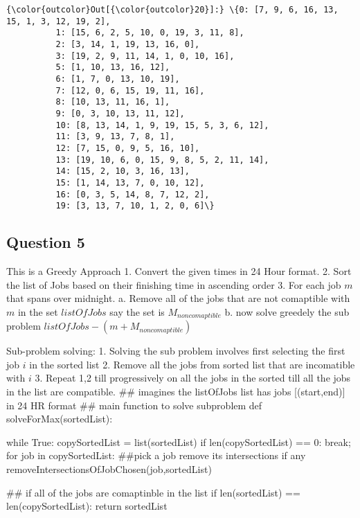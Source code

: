\documentclass[11pt]{article}
\begin{document}
\begin{Verbatim}[commandchars=\\\{\}]
{\color{outcolor}Out[{\color{outcolor}20}]:} \{0: [7, 9, 6, 16, 13, 15, 1, 3, 12, 19, 2],
          1: [15, 6, 2, 5, 10, 0, 19, 3, 11, 8],
          2: [3, 14, 1, 19, 13, 16, 0],
          3: [19, 2, 9, 11, 14, 1, 0, 10, 16],
          5: [1, 10, 13, 16, 12],
          6: [1, 7, 0, 13, 10, 19],
          7: [12, 0, 6, 15, 19, 11, 16],
          8: [10, 13, 11, 16, 1],
          9: [0, 3, 10, 13, 11, 12],
          10: [8, 13, 14, 1, 9, 19, 15, 5, 3, 6, 12],
          11: [3, 9, 13, 7, 8, 1],
          12: [7, 15, 0, 9, 5, 16, 10],
          13: [19, 10, 6, 0, 15, 9, 8, 5, 2, 11, 14],
          14: [15, 2, 10, 3, 16, 13],
          15: [1, 14, 13, 7, 0, 10, 12],
          16: [0, 3, 5, 14, 8, 7, 12, 2],
          19: [3, 13, 7, 10, 1, 2, 0, 6]\}
\end{Verbatim}
            
    \subsection{Question 5}\label{question-5}

    This is a Greedy Approach 1. Convert the given times in 24 Hour format.
2. Sort the list of Jobs based on their finishing time in ascending
order 3. For each job \(m\) that spans over midnight. a. Remove all of
the jobs that are not comaptible with \(m\) in the set \(listOfJobs\)
say the set is \(M_{noncomaptible}\) b. now solve greedely the sub
problem \(listOfJobs - (m + M_{noncomaptible})\)

Sub-problem solving: 1. Solving the sub problem involves first selecting
the first job \(i\) in the sorted list 2. Remove all the jobs from
sorted list that are incomatible with \(i\) 3. Repeat 1,2 till
progressively on all the jobs in the sorted till all the jobs in the
list are compatible.
## imagines the listOfJobs list has jobs [(start,end)] in 24 HR format
## main function to solve subproblem 
def solveForMax(sortedList):
    
    
    while True:
        copySortedList = list(sortedList)
        if len(copySortedList) == 0:
            break;
        for job in copySortedList:
            ##pick a job remove its intersections if any
            removeIntersectionsOfJobChosen(job,sortedList) 
            
        ## if all of the jobs are comaptinble in the list
        if len(sortedList) == len(copySortedList): 
            return sortedList        
            
\end{document}
